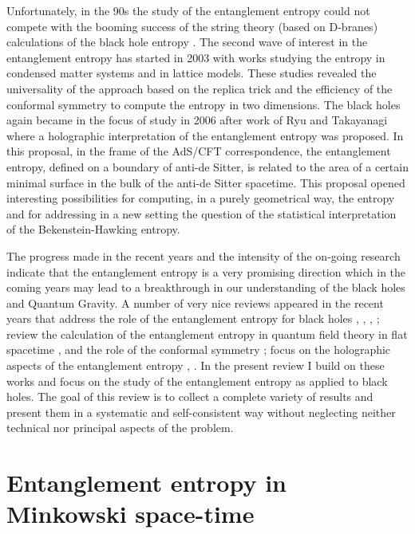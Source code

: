 \documentclass[12pt]{article}
\begin{document}
Unfortunately, in the 90s the study of the entanglement entropy could not compete with the booming success of the  string theory  (based on D-branes) calculations of the black hole entropy \cite{Strominger:1996sh}. The second wave of interest in the entanglement entropy has started in 2003 with works studying the entropy in condensed matter systems and in lattice models. These studies revealed the universality of the approach based on the replica trick and the efficiency of the conformal symmetry to compute the entropy in two dimensions. The black holes again became  in the focus of  study in 2006 after work of Ryu and Takayanagi \cite{Ryu:2006bv} where a holographic interpretation of the entanglement entropy was proposed. In this proposal, in the frame of the AdS/CFT correspondence, the entanglement entropy, defined on a boundary of anti-de Sitter,  is  related to the area of a certain minimal surface in the bulk of the anti-de Sitter spacetime. This proposal opened interesting possibilities for computing, in a purely geometrical way, the entropy and for addressing in a new  setting the question of the statistical interpretation of the Bekenstein-Hawking entropy.  

The progress made in the recent years and the intensity of the on-going research indicate that the entanglement entropy is a very promising direction which in the coming years  may lead to a breakthrough in our understanding of the black holes and  Quantum Gravity. 
A number of very nice reviews appeared in the recent years that address the role of the entanglement entropy for black holes \cite{Bekenstein:1994bc},  \cite{Frolov:1998vs}, \cite{Jacobson:2003wv},  \cite{Das:2008sy}; review the calculation of the entanglement entropy in quantum field theory in flat spacetime 
\cite{Eisert:2008ur}, \cite{Casini:2009sr}  and the role of the conformal symmetry \cite{Calabrese:2009qy};   focus on the holographic aspects of the entanglement entropy \cite{Nishioka:2009un}, \cite{Barbon:2009zz}. In the present review I build on these works and focus on the study of the entanglement entropy as applied to black holes. 
The goal of this review is to collect a complete variety of results and present them in a systematic and self-consistent  way  without neglecting neither technical nor principal aspects of the problem. 
 
 

            






\section{Entanglement entropy in Minkowski space-time}
\label{section: Minkowski} 
\end{document}
